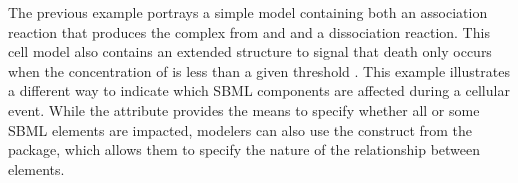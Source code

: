 The previous example portrays a simple model containing both an association reaction that produces the complex  from  and  and a dissociation reaction. This cell model also contains an extended \Event structure to signal that death only occurs when the concentration of  is less than a given threshold . This example illustrates a different way to indicate which SBML components are affected during a cellular event. While the  attribute provides the means to specify whether all or some SBML elements are impacted, modelers can also use the \ListofGroups construct from the  package, which allows them to specify the nature of the relationship between elements.